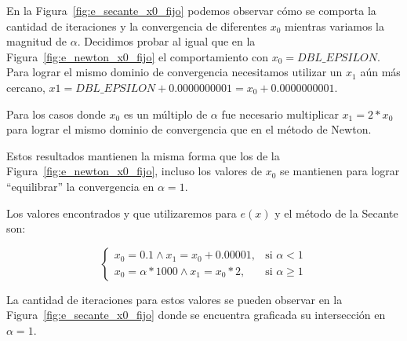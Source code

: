 En la Figura~\ref{fig:e_secante_x0_fijo} podemos observar cómo se comporta la
cantidad de iteraciones y la convergencia de diferentes $x_0$ mientras variamos
la magnitud de $\alpha$. Decidimos probar al igual que en la
Figura~\ref{fig:e_newton_x0_fijo} el comportamiento con $x_0 =
\textit{DBL\_EPSILON}$. Para lograr el mismo dominio de convergencia
necesitamos utilizar un $x_1$ aún más cercano,  $x1 = \textit{DBL\_EPSILON} +
0.0000000001 = x_0 + 0.0000000001$.

Para los casos donde $x_0$ es un múltiplo de $\alpha$ fue necesario multiplicar
$x_1 = 2 * x_0$ para lograr el mismo dominio de convergencia que en el método
de Newton.

Estos resultados mantienen la misma forma que los de la
Figura~\ref{fig:e_newton_x0_fijo}, incluso los valores de $x_0$ se mantienen
para lograr ``equilibrar'' la convergencia en $\alpha = 1$.

Los valores encontrados y que utilizaremos para $e(x)$ y el método de la
Secante son:

\[
\begin{cases}
x_0 = 0.1 \wedge x_1 = x_0 + 0.00001, & \mbox{si } \alpha < 1\\
x_0 = \alpha * 1000 \wedge x_1 = x_0 * 2, & \mbox{si } \alpha \ge 1
\end{cases}
\]

La cantidad de iteraciones para estos valores se pueden observar en la
Figura~\ref{fig:e_secante_x0_fijo} donde se encuentra graficada su intersección
en $\alpha = 1$.
